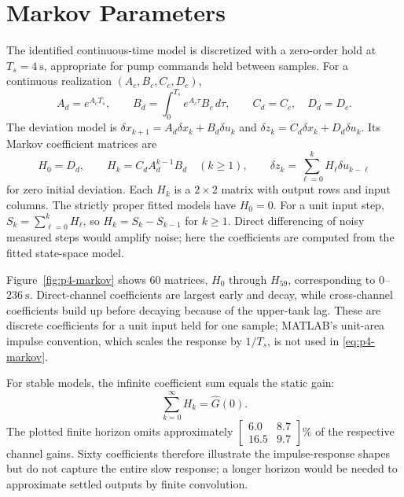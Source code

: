 \section{Markov Parameters}

The identified continuous-time model is discretized with a zero-order
hold at $T_s=4\ \mathrm{s}$, appropriate for pump commands held between
samples. For a continuous realization $(A_c,B_c,C_c,D_c)$,
\begin{equation}
 A_d=e^{A_cT_s},\qquad
 B_d=\int_0^{T_s}e^{A_c\tau}B_c\,d\tau,\qquad C_d=C_c,\quad D_d=D_c.
\end{equation}
The deviation model is
$\delta x_{k+1}=A_d\delta x_k+B_d\delta u_k$ and
$\delta z_k=C_d\delta x_k+D_d\delta u_k$.
Its Markov coefficient matrices are
\begin{equation}
 H_0=D_d,\qquad H_k=C_dA_d^{k-1}B_d\quad(k\geq1),\qquad
 \delta z_k=\sum_{\ell=0}^{k}H_\ell\delta u_{k-\ell}
 \label{eq:p4-markov}
\end{equation}
for zero initial deviation. Each $H_k$ is a $2\times2$ matrix with output
rows and input columns. The strictly proper fitted models have $H_0=0$.
For a unit input step, $S_k=\sum_{\ell=0}^kH_\ell$, so
$H_k=S_k-S_{k-1}$ for $k\geq1$. Direct differencing of noisy measured
steps would amplify noise; here the coefficients are computed from the
fitted state-space model.

Figure~\ref{fig:p4-markov} shows 60 matrices, $H_0$ through $H_{59}$,
corresponding to $0$--$236\ \mathrm{s}$. Direct-channel coefficients
are largest early and decay, while cross-channel coefficients build up
before decaying because of the upper-tank lag. These are discrete
coefficients for a unit input held for one sample; MATLAB's unit-area
impulse convention, which scales the response by $1/T_s$, is not used in
\eqref{eq:p4-markov}.

For stable models, the infinite coefficient sum equals the static gain:
\begin{equation}
 \sum_{k=0}^{\infty}H_k=\widehat G(0).
\end{equation}
The plotted finite horizon omits approximately
$\begin{bmatrix}6.0&8.7\\16.5&9.7\end{bmatrix}\%$
of the respective channel gains. Sixty coefficients therefore illustrate
the impulse-response shapes but do not capture the entire slow response;
a longer horizon would be needed to approximate settled outputs by finite
convolution.

